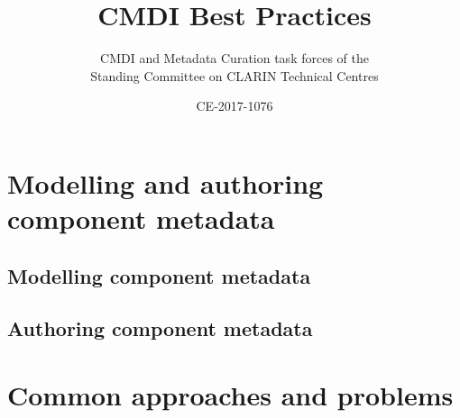 \documentclass[twoside]{book}
\date{CE-2017-1076\\[1.5\baselineskip]\ifthenelse{\boolean{bpdraft}}{Version \bpversion{} DRAFT\\ \today}{Version \bpversion}}
\begin{document}
\title{CMDI Best Practices}

\author{CMDI and Metadata Curation task forces of the\\Standing Committee on CLARIN Technical Centres}

\frontmatter
\maketitle



\cleardoublepage
\tableofcontents

\cleardoublepage
\label{introduction}





\mainmatter


\chapter{Modelling and authoring component metadata}

\section{Modelling component metadata}\label{modelling-component-metadata}







\section{Authoring component metadata}\label{authoring-component-metadata-records}







\chapter{Common approaches and problems}\label{common-approaches-problems}







\end{document}
